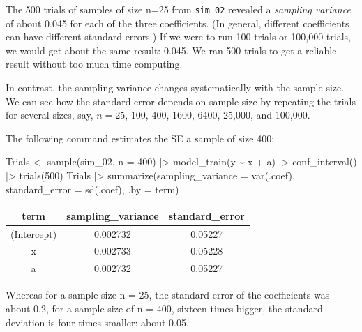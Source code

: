 \documentclass[
  letterpaper,
  DIV=11,
  numbers=noendperiod,
  oneside]{scrartcl}
\newenvironment{Shaded}{\begin{snugshade}}{\end{snugshade}}
\newcommand{\AttributeTok}[1]{\textcolor[rgb]{0.40,0.45,0.13}{#1}}
\newcommand{\DecValTok}[1]{\textcolor[rgb]{0.68,0.00,0.00}{#1}}
\newcommand{\FunctionTok}[1]{\textcolor[rgb]{0.28,0.35,0.67}{#1}}
\newcommand{\NormalTok}[1]{\textcolor[rgb]{0.00,0.23,0.31}{#1}}
\newcommand{\OtherTok}[1]{\textcolor[rgb]{0.00,0.23,0.31}{#1}}
\newcommand{\SpecialCharTok}[1]{\textcolor[rgb]{0.37,0.37,0.37}{#1}}
\begin{document}
The 500 trials of samples of size n=25 from \texttt{sim\_02} revealed a
\emph{sampling variance} of about 0.045 for each of the three
coefficients. (In general, different coefficients can have different
standard errors.) If we were to run 100 trials or 100,000 trials, we
would get about the same result: 0.045. We ran 500 trials to get a
reliable result without too much time computing.

In contrast, the sampling variance changes systematically with the
sample size. We can see how the standard error depends on sample size by
repeating the trials for several sizes, say, \(n=25\), 100, 400, 1600,
6400, 25,000, and 100,000.

The following command estimates the SE a sample of size 400:

\begin{Shaded}
\begin{Highlighting}[]
\NormalTok{Trials }\OtherTok{\textless{}{-}} 
  \FunctionTok{sample}\NormalTok{(sim\_02, }\AttributeTok{n =} \DecValTok{400}\NormalTok{) }\SpecialCharTok{|\textgreater{}}
    \FunctionTok{model\_train}\NormalTok{(y }\SpecialCharTok{\textasciitilde{}}\NormalTok{ x }\SpecialCharTok{+}\NormalTok{ a) }\SpecialCharTok{|\textgreater{}}
    \FunctionTok{conf\_interval}\NormalTok{() }\SpecialCharTok{|\textgreater{}}
    \FunctionTok{trials}\NormalTok{(}\DecValTok{500}\NormalTok{)}
\NormalTok{Trials }\SpecialCharTok{|\textgreater{}} 
  \FunctionTok{summarize}\NormalTok{(}\AttributeTok{sampling\_variance =} \FunctionTok{var}\NormalTok{(.coef), }
            \AttributeTok{standard\_error =} \FunctionTok{sd}\NormalTok{(.coef), }
            \AttributeTok{.by =}\NormalTok{ term)}
\end{Highlighting}
\end{Shaded}

\begin{longtable}[]{@{}ccc@{}}
\toprule\noalign{}
term & sampling\_variance & standard\_error \\
\midrule\noalign{}
\endhead
\bottomrule\noalign{}
\endlastfoot
(Intercept) & 0.002732 & 0.05227 \\
x & 0.002733 & 0.05228 \\
a & 0.002732 & 0.05227 \\
\end{longtable}

Whereas for a sample size n = 25, the standard error of the coefficients
was about 0.2, for a sample size of n = 400, sixteen times bigger, the
standard deviation is four times smaller: about 0.05.
\end{document}
